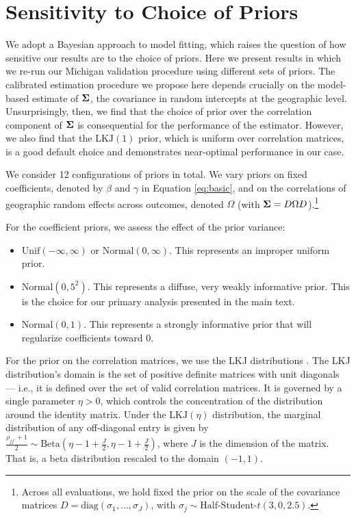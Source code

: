 \section{Sensitivity to Choice of Priors}
\label{apx:priors}
We adopt a Bayesian approach to model fitting, which raises the question of how sensitive our results are to the choice of priors.
Here we present results in which we re-run our Michigan validation procedure using different sets of priors. 
The calibrated estimation procedure we propose here depends crucially on the model-based estimate of $\mathbf{\Sigma}$, the covariance in random intercepts at the geographic level.
Unsurprisingly, then, we find that the choice of prior over the correlation component of $\mathbf{\Sigma}$ is consequential for the performance of the estimator. 
However, we also find that the $\mathrm{LKJ}(1)$ prior, which is uniform over correlation matrices, is a good default choice and demonstrates near-optimal performance in our case. 

We consider 12 configurations of priors in total. 
We vary priors on fixed coefficients, denoted by $\beta$ and $\gamma$ in Equation \ref{eq:basic}, and on the correlations of geographic random effects across outcomes, denoted $\Omega$ (with $\mathbf{\Sigma} = D \Omega D$).\footnote{Across all evaluations, we hold fixed the prior on the scale of the covariance matrices $D = \mathrm{diag}(\sigma_1, \dots, \sigma_J)$, with $\sigma_j \sim \text{Half-Student-}t(3, 0, 2.5)$.}


For the coefficient priors, we assess the effect of the prior variance:
\begin{itemize}
  \item $\mathrm{Unif}(-\infty, \infty)$ or $\mathrm{Normal}(0, \infty)$. This represents an improper uniform prior.
  \item $\mathrm{Normal}(0, 5^2)$. This represents a diffuse, very weakly informative prior. This is the choice for our primary analysis presented in the main text. 
  \item $\mathrm{Normal}(0, 1)$. This represents a strongly informative prior that will regularize coefficients toward 0.
\end{itemize}


For the prior on the correlation matrices, we use the LKJ distributions \citep{Lewandowski2009}.
The LKJ distribution's domain is the set of positive definite matrices with unit diagonals --- i.e., it is defined over the set of valid correlation matrices.
It is governed by a single parameter $\eta >0$, which controls the concentration of the distribution around the identity matrix. 
Under the $\mathrm{LKJ}(\eta)$ distribution, the marginal distribution of any off-diagonal entry is given by $\frac{\rho_{jj'}+1}{2} \sim \mathrm{Beta}(\eta - 1 + \frac{J}{2}, \eta - 1 + \frac{J}{2})$, where $J$ is the dimension of the matrix.
That is, a beta distribution rescaled to the domain $(-1, 1)$.

